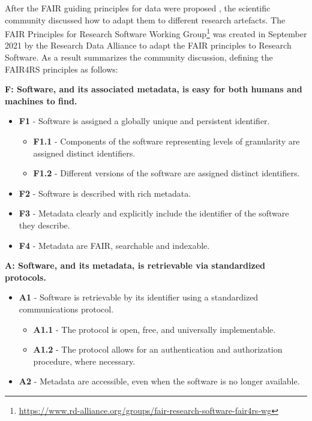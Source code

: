 After the FAIR guiding principles for data were proposed \cite{wilkinson_fair_2016}, the scientific community discussed how to adapt them to different research artefacts. The FAIR Principles for Research Software Working Group\footnote{\url{https://www.rd-alliance.org/groups/fair-research-software-fair4rs-wg}} was created in September 2021 by the Research Data Alliance to adapt the FAIR principles to Research Software. As a result \cite{chue_hong_neil_p_2022_6623556} summarizes the community discussion, defining the FAIR4RS principles as follows:

\textbf{F: Software, and its associated metadata, is easy for both humans and machines to find.}

\begin{itemize}
    \item \textbf{F1} - Software is assigned a globally unique and persistent identifier.
    \begin{itemize}
        \item \textbf{F1.1} - Components of the software representing levels of granularity are assigned distinct identifiers.
        \item \textbf{F1.2} - Different versions of the software are assigned distinct identifiers.
    \end{itemize}

    \item \textbf{F2} - Software is described with rich metadata.
    \item \textbf{F3} - Metadata clearly and explicitly include the identifier of the software they describe.
    \item \textbf{F4} - Metadata are FAIR, searchable and indexable.
\end{itemize}

\textbf{A: Software, and its metadata, is retrievable via standardized protocols.}

\begin{itemize}
    \item \textbf{A1} - Software is retrievable by its identifier using a standardized communications protocol.

    \begin{itemize}
        \item \textbf{A1.1} - The protocol is open, free, and universally implementable.
        \item \textbf{A1.2} - The protocol allows for an authentication and authorization procedure, where necessary.
    \end{itemize}

    \item \textbf{A2} - Metadata are accessible, even when the software is no longer available.
\end{itemize}

